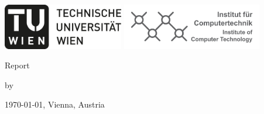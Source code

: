 
\begin{titlepage}

	\begin{center}

	\includegraphics[height=2cm]{fig/logo-tu-bw.png}%
	\hfill{}%
	\includegraphics[height=2cm]{fig/logo-ict.png}%
	

	\vspace{5em}

	{\Huge Report}
	\vspace{3em}

	{\large by}

	\vspace{3em}

	{\huge \theauthor}

	\vspace{5em}

	{\Huge \thetitle}

	\vspace{4em}
	{\large  }

	

	\vspace{3em}

	\large
	\today, Vienna, Austria
\end{center}

	\vspace{2em}


	\vspace{2em}


\end{titlepage}




